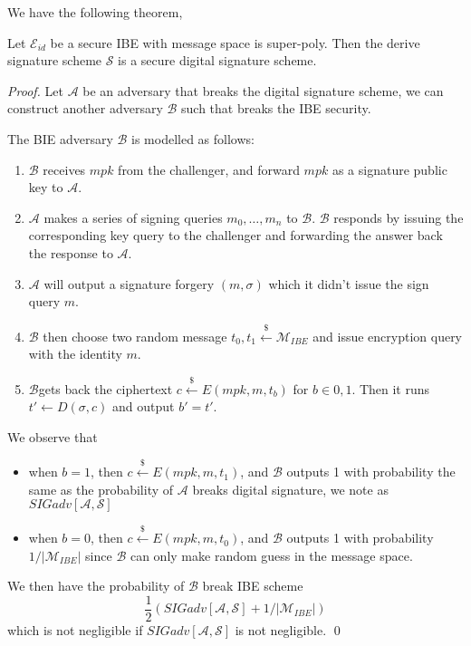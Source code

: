 We have the following theorem,
\begin{theorem}
    Let $\mathcal{E}_{id}$ be a secure IBE with message space is super-poly. Then the derive signature scheme $\mathcal{S}$ is a secure digital signature scheme. 
\end{theorem}
\begin{proof}
    Let $\mathcal{A}$ be an adversary that breaks the digital signature scheme, we can construct another adversary $\mathcal{B}$ such that breaks the IBE security.

    The BIE adversary $\mathcal{B}$ is modelled as follows:
    \begin{enumerate}
        \item $\mathcal{B}$ receives $mpk$ from the challenger, and forward $mpk$ as a signature public key to $\mathcal{A}$. 
        \item $\mathcal{A}$ makes a series of signing queries $m_0,\dots,m_n$ to $\mathcal{B}$. $\mathcal{B}$ responds by issuing the corresponding key query to the challenger and forwarding the answer back the response to $\mathcal{A}$. 
        \item $\mathcal{A}$ will output a signature forgery $(m,\sigma)$ which it didn't issue the sign query $m$. 
        \item $\mathcal{B}$ then choose two random message $t_0,t_1\stackrel{\$}{\gets}\mathcal{M}_{IBE}$ and issue encryption query with the identity $m$.
        \item $\mathcal{B} $gets back the ciphertext $c\stackrel{\$}{\gets}E(mpk,m,t_b)$ for $b\in{0,1}$. Then it runs $t'\gets D(\sigma,c)$ and output $b'=t'$. 
    \end{enumerate}
    We observe that 
    \begin{itemize}
        \item when $b = 1$, then $c\stackrel{\$}{\gets}E(mpk, m,t_1)$, and $\mathcal{B}$ outputs 1 with probability the same as the probability of $\mathcal{A}$ breaks digital signature, we note as $SIGadv[\mathcal{A,S}]$
        \item when $b = 0$, then $c\stackrel{\$}{\gets}E(mpk, m,t_0)$, and $\mathcal{B}$ outputs 1 with probability $1/|\mathcal{M}_{IBE}|$ since $\mathcal{B}$ can only make random guess in the message space. 
    \end{itemize}
    We then have the probability of $\mathcal{B}$ break IBE scheme
    \[
        \frac{1}{2}(SIGadv[\mathcal{A,S}] + 1/|\mathcal{M}_{IBE}|)
    \]
    which is not negligible if $SIGadv[\mathcal{A,S}]$ is not negligible. \qed

\end{proof}
